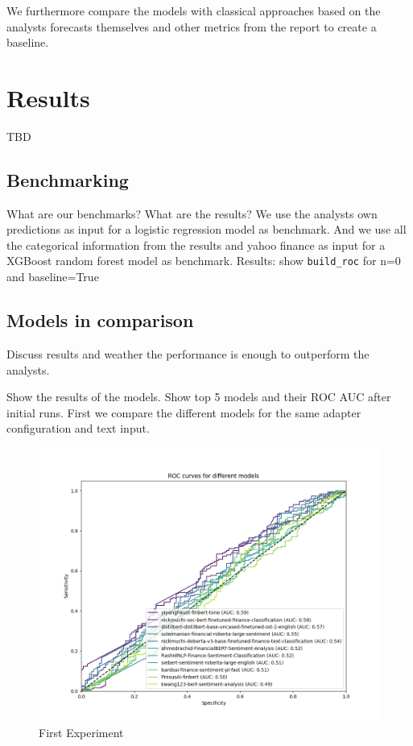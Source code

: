 \documentclass[conference]{IEEEtran}
\begin{document}
We furthermore compare the models with classical approaches based on the analysts forecasts themselves and other metrics from the report to create a baseline.

\newpage
\section{Results}%
TBD

\subsection{Benchmarking}%
What are our benchmarks? What are the results?
We use the analysts own predictions as input for a logistic regression model as benchmark.
And we use all the categorical information from the results and yahoo finance as input for a XGBoost random forest model as benchmark.
Results: show \texttt{build\_roc} for n=0 and baseline=True

\subsection{Models in comparison}%
Discuss results and weather the performance is enough to outperform the analysts.

Show the results of the models.  Show top 5 models and their ROC AUC after initial runs.
First we compare the different models for the same adapter configuration and text input.

\begin{figure}[h!]
    \centering
    \includegraphics[width=.85\linewidth]{../3. evaluation/roc_curves/First Experiment.png}
    \caption[First Experiment]{First Experiment}
    \label{fig:Firstexp}
\end{figure}
\end{document}
